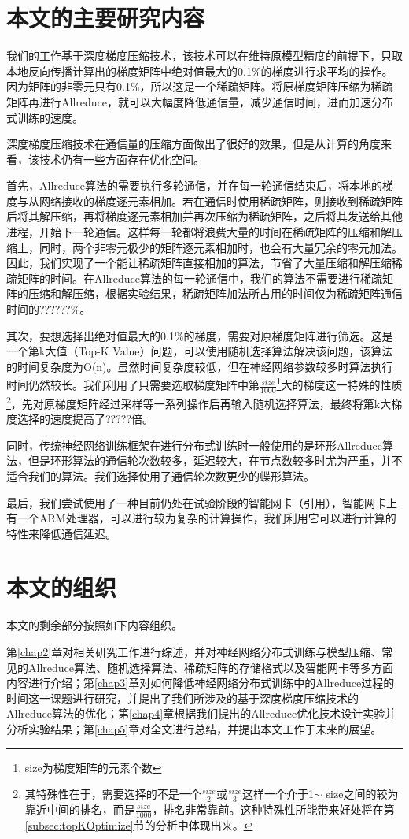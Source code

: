 \section{本文的主要研究内容}
我们的工作基于深度梯度压缩技术，该技术可以在维持原模型精度的前提下，只取本地反向传播计算出的梯度矩阵中绝对值最大的0.1\%的梯度进行求平均的操作。因为矩阵的非零元只有0.1\%，所以这是一个稀疏矩阵。将原梯度矩阵压缩为稀疏矩阵再进行Allreduce，就可以大幅度降低通信量，减少通信时间，进而加速分布式训练的速度。

深度梯度压缩技术在通信量的压缩方面做出了很好的效果，但是从计算的角度来看，该技术仍有一些方面存在优化空间。

首先，Allreduce算法的需要执行多轮通信，并在每一轮通信结束后，将本地的梯度与从网络接收的梯度逐元素相加。若在通信时使用稀疏矩阵，则接收到稀疏矩阵后将其解压缩，再将梯度逐元素相加并再次压缩为稀疏矩阵，之后将其发送给其他进程，开始下一轮通信。这样每一轮都将浪费大量的时间在稀疏矩阵的压缩和解压缩上，同时，两个非零元极少的矩阵逐元素相加时，也会有大量冗余的零元加法。因此，我们实现了一个能让稀疏矩阵直接相加的算法，节省了大量压缩和解压缩稀疏矩阵的时间。在Allreduce算法的每一轮通信中，我们的算法不需要进行稀疏矩阵的压缩和解压缩，根据实验结果，稀疏矩阵加法所占用的时间仅为稀疏矩阵通信时间的??????\%。

其次，要想选择出绝对值最大的0.1\%的梯度，需要对原梯度矩阵进行筛选。这是一个第k大值（Top-K Value）问题，可以使用随机选择算法解决该问题，该算法的时间复杂度为O(n)。虽然时间复杂度较低，但在神经网络参数较多时算法执行时间仍然较长。我们利用了只需要选取梯度矩阵中第$\frac{size}{1000}$\footnote{size为梯度矩阵的元素个数}大的梯度这一特殊的性质\footnote{其特殊性在于，需要选择的不是一个$\frac{size}{2}$或$\frac{size}{3}$这样一个介于1$\sim$ size之间的较为靠近中间的排名，而是$\frac{size}{1000}$，排名非常靠前。这种特殊性所能带来好处将在第\ref{subsec:topKOptimize}节的分析中体现出来。}，先对原梯度矩阵经过采样等一系列操作后再输入随机选择算法，最终将第k大梯度选择的速度提高了?????倍。

同时，传统神经网络训练框架在进行分布式训练时一般使用的是环形Allreduce算法，但是环形算法的通信轮次数较多，延迟较大，在节点数较多时尤为严重，并不适合我们的算法。我们选择使用了通信轮次数更少的蝶形算法。

最后，我们尝试使用了一种目前仍处在试验阶段的智能网卡（引用），智能网卡上有一个ARM处理器，可以进行较为复杂的计算操作，我们利用它可以进行计算的特性来降低通信延迟。

\section{本文的组织}

本文的剩余部分按照如下内容组织。

第\ref{chap2}章对相关研究工作进行综述，并对神经网络分布式训练与模型压缩、常见的Allreduce算法、随机选择算法、稀疏矩阵的存储格式以及智能网卡等多方面内容进行介绍；第\ref{chap3}章对如何降低神经网络分布式训练中的Allreduce过程的时间这一课题进行研究，并提出了我们所涉及的基于深度梯度压缩技术的Allreduce算法的优化；第\ref{chap4}章根据我们提出的Allreduce优化技术设计实验并分析实验结果；第\ref{chap5}章对全文进行总结，并提出本文工作于未来的展望。